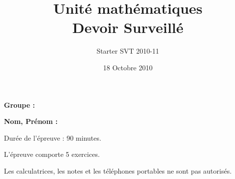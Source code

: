 




\title{Unité mathématiques \\ Devoir Surveillé}
\author{Starter SVT 2010-11}
\date{18 Octobre 2010}



\maketitle
\noindent\textbf{Groupe :}

\vspace{.5cm}

\noindent\textbf{Nom, Prénom :}

\vspace{1cm}

Durée de l'épreuve : 90 minutes. 

L'épreuve comporte 5 exercices.  

Les calculatrices, les notes et les téléphones portables ne sont pas autorisés.

\vspace{1cm}

%




\newpage
{}

\newpage



\newpage



\newpage 
{}


